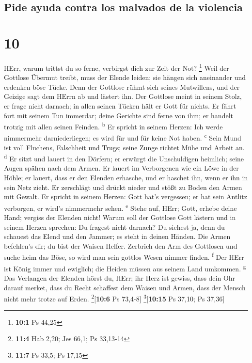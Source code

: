 \hypertarget{pide-ayuda-contra-los-malvados-de-la-violencia}{%
\subsection{Pide ayuda contra los malvados de la
violencia}\label{pide-ayuda-contra-los-malvados-de-la-violencia}}

\hypertarget{section-9}{%
\section{10}\label{section-9}}

 HErr, warum trittst du so ferne, verbirgst dich zur Zeit
der Not? \footnote{\textbf{10:1} Ps 44,25}  Weil der
Gottlose Übermut treibt, muss der Elende leiden; sie hängen sich
aneinander und erdenken böse Tücke.  Denn der Gottlose
rühmt sich seines Mutwillens, und der Geizige sagt dem HErrn ab und
lästert ihn.  Der Gottlose meint in seinem Stolz, er frage
nicht darnach; in allen seinen Tücken hält er Gott für nichts.
 Er fährt fort mit seinem Tun immerdar; deine Gerichte
sind ferne von ihm; er handelt trotzig mit allen seinen Feinden.
\textsuperscript{b}  Er spricht in seinem Herzen: Ich
werde nimmermehr darniederliegen; es wird für und für keine Not haben.
\textsuperscript{c}  Sein Mund ist voll Fluchens,
Falschheit und Trugs; seine Zunge richtet Mühe und Arbeit an.
\textsuperscript{d}  Er sitzt und lauert in den Dörfern;
er erwürgt die Unschuldigen heimlich; seine Augen spähen nach dem Armen.
 Er lauert im Verborgenen wie ein Löwe in der Höhle; er
lauert, dass er den Elenden erhasche, und er haschet ihn, wenn er ihn in
sein Netz zieht.  Er zerschlägt und drückt nieder und
stößt zu Boden den Armen mit Gewalt.  Er spricht in
seinem Herzen: Gott hat's vergessen; er hat sein Antlitz verborgen, er
wird's nimmermehr sehen. \textsuperscript{e}  Stehe auf,
HErr; Gott, erhebe deine Hand; vergiss der Elenden nicht!
 Warum soll der Gottlose Gott lästern und in seinem
Herzen sprechen: Du fragest nicht darnach?  Du siehest
ja, denn du schauest das Elend und den Jammer; es steht in deinen
Händen. Die Armen befehlen's dir; du bist der Waisen Helfer.
 Zerbrich den Arm des Gottlosen und suche heim das Böse,
so wird man sein gottlos Wesen nimmer finden. \textsuperscript{f}
 Der HErr ist König immer und ewiglich; die Heiden müssen
aus seinem Land umkommen. \textsuperscript{g}  Das
Verlangen der Elenden hörst du, HErr; ihr Herz ist gewiss, dass dein Ohr
darauf merket,  dass du Recht schaffest dem Waisen und
Armen, dass der Mensch nicht mehr trotze auf Erden.
\footnote{\textbf{11:4} Hab 2,20; Jes 66,1; Ps 33,13-14}{[}\textbf{10:6}
Ps 73,4-8{]} \footnote{\textbf{11:7} Ps 33,5; Ps 17,15}{[}\textbf{10:15}
Ps 37,10; Ps 37,36{]}

